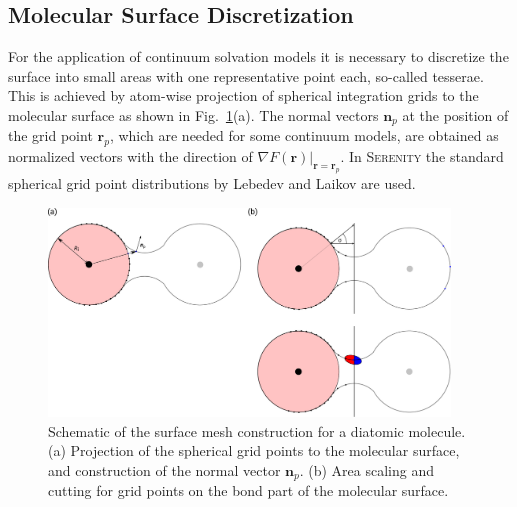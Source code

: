 \subsection{Molecular Surface Discretization}
For the application of continuum solvation models\cite{Tomasi2005} it is necessary to
discretize the surface into small areas with one representative point each, so-called tesserae.
This is achieved by atom-wise projection of spherical integration grids to the molecular
surface as shown in Fig.~\ref{fig:delleySurfaceConstruction}(a). The normal vectors $\pmb{n}_p$
at the position of the grid point $\pmb{r}_p$, which are needed for some continuum models, are obtained as
normalized vectors with the direction of $\left.\nabla F(\pmb{r})\right|_{\pmb{r}=\pmb{r}_p}$.
In \textsc{Serenity} the standard spherical grid point distributions by Lebedev and Laikov are used.
\begin{figure}
	\centering
	\includegraphics[width=0.95\textwidth]{figs/delleyFigure.pdf}
	\caption{Schematic of the surface mesh construction for a diatomic molecule.
			 (a) Projection of the spherical grid points to the molecular surface, and
			     construction of the normal vector $\pmb{n}_p$.
			 (b) Area scaling and cutting for grid points on the bond part of the molecular
			     surface.}
	\label{fig:delleySurfaceConstruction}
\end{figure}

